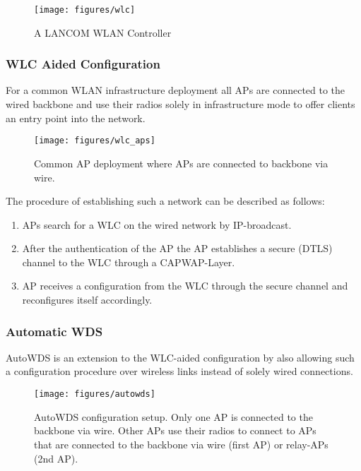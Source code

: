 	\begin{figure}[h!]
	  \centering
	  \texttt{[image: figures/wlc]}
	  \caption{A LANCOM WLAN Controller \cite{lancom}}
	  \label{fig:wlc}
	\end{figure}
	
	\newpage
      
      \subsubsection{WLC Aided Configuration}
	For a common \ac{WLAN} infrastructure deployment all APs are connected to the wired backbone and use their radios solely in infrastructure mode to 
	offer clients an entry point into the network.
	\begin{figure}[h!]
	  \centering
	  \texttt{[image: figures/wlc\_aps]}
	  \caption{Common \ac{AP} deployment where APs are connected to backbone via wire.}
	  \label{fig:wlc_aps}
	\end{figure}
	The procedure of establishing such a network can be described as follows:
	\begin{enumerate}
	 \item APs search for a \ac{WLC} on the wired network by \ac{IP}-broadcast.
	 \item After the authentication of the \ac{AP} the \ac{AP} establishes a secure (\ac{DTLS}) channel to the \ac{WLC} through a \ac{CAPWAP}-Layer.
	 \item \ac{AP} receives a configuration from the \ac{WLC} through the secure channel and reconfigures itself accordingly.
	\end{enumerate}
	
      \subsubsection{Automatic \ac{WDS}}
	\label{autowdsbasic}
	AutoWDS is an extension to the \ac{WLC}-aided configuration by also allowing such a configuration procedure over wireless links instead of solely wired connections.
            
	\begin{figure}[h!]
	  \centering
	  \texttt{[image: figures/autowds]}
	  \caption{AutoWDS configuration setup. Only one AP is connected to the backbone via wire. 
	    Other APs use their radios to connect to APs that are connected to the backbone via wire (first \ac{AP}) or relay-APs (2nd \ac{AP}).}
	  \label{fig:autowds}
	\end{figure}
	

